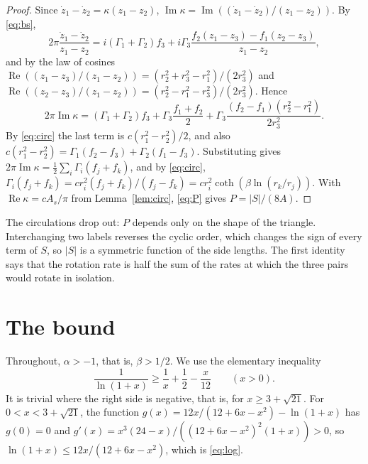 \documentclass[11pt]{article}
\theoremstyle{definition}
\newcommand{\re}{\operatorname{Re}}
\newcommand{\im}{\operatorname{Im}}
\begin{document}
\begin{proof}
Since $\dot z_1 - \dot z_2 = \kappa(z_1 - z_2)$, $\im\kappa = \im((\dot z_1 - \dot z_2)/(z_1 - z_2))$. By \eqref{eq:bs},
\[
2\pi\frac{\dot z_1 - \dot z_2}{z_1 - z_2} = i(\Gamma_1 + \Gamma_2) f_3 + i\Gamma_3 \frac{f_2(z_1 - z_3) - f_1(z_2 - z_3)}{z_1 - z_2},
\]
and by the law of cosines $\re((z_1 - z_3)/(z_1 - z_2)) = (r_2^2 + r_3^2 - r_1^2)/(2r_3^2)$ and $\re((z_2 - z_3)/(z_1 - z_2)) = (r_2^2 - r_1^2 - r_3^2)/(2r_3^2)$. Hence
\[
2\pi\im\kappa = (\Gamma_1 + \Gamma_2) f_3 + \Gamma_3 \frac{f_1 + f_2}{2} + \Gamma_3 \frac{(f_2 - f_1)(r_2^2 - r_1^2)}{2r_3^2}.
\]
By \eqref{eq:circ} the last term is $c(r_1^2 - r_2^2)/2$, and also $c(r_1^2 - r_2^2) = \Gamma_1(f_2 - f_3) + \Gamma_2(f_1 - f_3)$. Substituting gives $2\pi\im\kappa = \frac12\sum_i \Gamma_i(f_j + f_k)$, and by \eqref{eq:circ}, $\Gamma_i(f_j + f_k) = c r_i^2 (f_j + f_k)/(f_j - f_k) = c r_i^2 \coth(\beta\ln(r_k/r_j))$. With $\re\kappa = cA_s/\pi$ from Lemma~\ref{lem:circ}, \eqref{eq:P} gives $P = |S|/(8A)$.
\end{proof}

The circulations drop out: $P$ depends only on the shape of the triangle. Interchanging two labels reverses the cyclic order, which changes the sign of every term of $S$, so $|S|$ is a symmetric function of the side lengths. The first identity says that the rotation rate is half the sum of the rates at which the three pairs would rotate in isolation.

\section{The bound}\label{sec:bound}

Throughout, $\alpha > -1$, that is, $\beta > 1/2$. We use the elementary inequality
\begin{equation}\label{eq:log}
\frac{1}{\ln(1 + x)} \ge \frac1x + \frac12 - \frac{x}{12} \qquad (x > 0).
\end{equation}
It is trivial where the right side is negative, that is, for $x \ge 3 + \sqrt{21}$. For $0 < x < 3 + \sqrt{21}$, the function $g(x) = 12x/(12 + 6x - x^2) - \ln(1 + x)$ has $g(0) = 0$ and $g'(x) = x^3(24 - x)/((12 + 6x - x^2)^2(1 + x)) > 0$, so $\ln(1 + x) \le 12x/(12 + 6x - x^2)$, which is \eqref{eq:log}.
\end{document}
